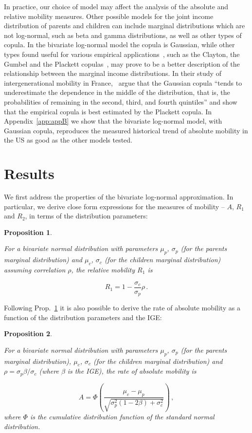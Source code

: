 \documentclass[12pt]{article}
\newtheorem{proposition}{Proposition}
\newcommand{\elabel}[1]{\label{eq:#1}}
\newcommand{\pref}[1]{Prop.~\ref{prop:#1}}
\newcommand{\be}{\begin{equation}}
\newcommand{\ee}{\end{equation}}
\numberwithin{equation}{section}
\begin{document}
In practice, our choice of model may affect the analysis of the absolute and relative mobility measures. Other possible models for the joint income distribution of parents and children can include marginal distributions which are not log-normal, such as beta and gamma distributions, as well as other types of copula. In the bivariate log-normal model the copula is Gaussian, while other types found useful for various empirical applications~\citep{trivedi2007copula}, such as the Clayton, the Gumbel and the Plackett copulas~\citep{bonhomme2009assessing}, may prove to be a better description of the relationship between the marginal income distributions. In their study of intergenerational mobility in France,~\citet{bonhomme2009assessing} argue that the Gaussian copula ``tends to underestimate the dependence in the middle of the distribution, that is, the probabilities of remaining in the second, third, and fourth quintiles'' and show that the empirical copula is best estimated by the Plackett copula. In Appendix~\ref{app:appB} we show that the bivariate log-normal model, with Gaussian copula, reproduces the measured historical trend of absolute mobility in the US as good as the other models tested.

\section{Results}
\label{sec:results}

We first address the properties of the bivariate log-normal approximation. In particular, we derive close form expressions for the measures of mobility -- $A$, $R_1$ and $R_2$, in terms of the distribution parameters:

\begin{proposition}
\label{prop:prop1}

For a bivariate normal distribution with parameters $\mu_p$, $\sigma_p$ (for the parents marginal distribution) and $\mu_c$, $\sigma_c$ (for the children marginal distribution) assuming correlation $\rho$, the relative mobility $R_1$ is

\be
R_1 = 1-\frac{\sigma_c}{\sigma_p}\rho \,.
\elabel{beta_rho}
\ee
\end{proposition}

Following \pref{prop1} it is also possible to derive the rate of absolute mobility as a function of the distribution parameters and the IGE:

\begin{proposition}
\label{prop:prop2}

For a bivariate normal distribution with parameters $\mu_p$, $\sigma_p$ (for the parents marginal distribution), $\mu_c$, $\sigma_c$ (for the children marginal distribution) and $\rho=\sigma_p\beta/\sigma_c$ (where $\beta$ is the IGE), the rate of absolute mobility is

\be
A = \Phi\left(\frac{\mu_c - \mu_p}{\sqrt{\sigma_p^2\left(1 - 2\beta\right) + \sigma_c^2}}\right) \,,
\elabel{abs2}
\ee
where $\Phi$ is the cumulative distribution function of the standard normal distribution.
\end{proposition}
\end{document}
